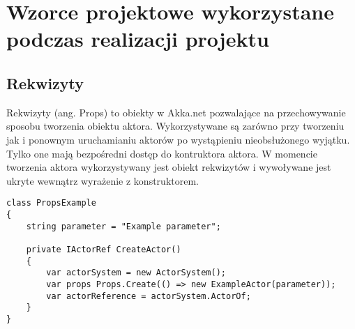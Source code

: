 \chapter{Wzorce projektowe wykorzystane podczas realizacji projektu}
\section{Rekwizyty}
Rekwizyty (ang. Props) to obiekty w Akka.net pozwalające na przechowywanie sposobu tworzenia obiektu aktora. 
Wykorzystywane są zarówno przy tworzeniu jak i ponownym uruchamianiu aktorów po wystąpieniu nieobsłużonego wyjątku.
Tylko one mają bezpośredni dostęp do kontruktora aktora. W momencie tworzenia aktora wykorzystywany jest obiekt rekwizytów i wywoływane jest ukryte wewnątrz wyrażenie z konstruktorem.

\begin{lstlisting}[caption = Przykład użycia rekwizytów, captionpos=b]
class PropsExample    
{
    string parameter = "Example parameter";
    
    private IActorRef CreateActor()
    {
        var actorSystem = new ActorSystem();
        var props Props.Create(() => new ExampleActor(parameter));
        var actorReference = actorSystem.ActorOf; 
    }
}
\end{lstlisting}

